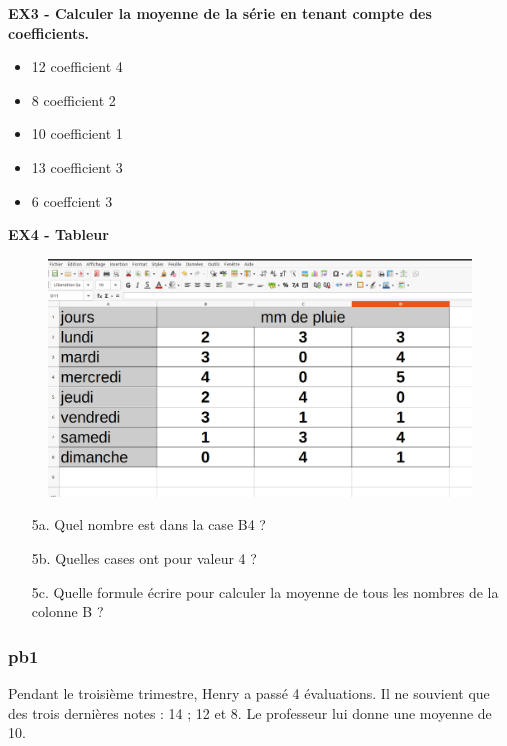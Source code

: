 \textbf{EX3 - Calculer la moyenne de la série en tenant compte des coefficients.}

\begin{minipage}[t]{0.2\textwidth}
  \begin{itemize}[label={$\bullet$}]
    \item 12 coefficient 4
    \item 8 coefficient 2
    \item 10 coefficient 1
    \item 13 coefficient 3
    \item 6 coeffcient 3 
  \end{itemize}
\end{minipage}
\begin{minipage}[t]{0.8\textwidth}
  \Pointilles[6]
\end{minipage}


\newpage

\textbf{EX4 - Tableur}

\begin{figure}[H]
  \centering
  \includegraphics[width=0.5\linewidth]{5x10-statistiques/tab.png}
\end{figure}

\begin{enumerate}
  \item[5a.] Quel nombre est dans la case B4 ? \dotfill
  \item[5b.] Quelles cases ont pour valeur 4 ? \dotfill
  \item[5c.] Quelle formule écrire pour calculer la moyenne de tous les nombres de la colonne B ?  \\ \Pointilles[1]
\end{enumerate}

\subsubsection*{pb1}

Pendant le troisième trimestre, Henry a passé 4 évaluations. Il ne souvient que des trois dernières notes : 14 ; 12 et 8. Le professeur lui donne une moyenne de 10. 

